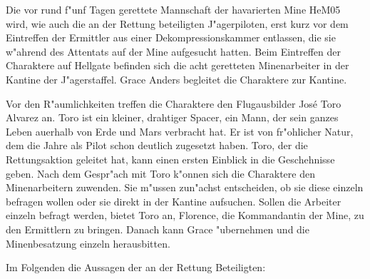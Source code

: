 
Die vor rund f"unf Tagen gerettete Mannschaft der havarierten Mine HeM05 wird, wie auch die an der Rettung beteiligten J"agerpiloten, erst kurz vor dem Eintreffen der Ermittler aus einer Dekompressionskammer entlassen, die sie w"ahrend des Attentats auf der Mine aufgesucht hatten. Beim Eintreffen der Charaktere auf Hellgate befinden sich die acht geretteten Minenarbeiter in der Kantine der J"agerstaffel. Grace Anders begleitet die Charaktere zur Kantine.

Vor den R"aumlichkeiten treffen die Charaktere den Flugausbilder Jos\'{e} \frqq{}Toro\flqq{} Alvarez an. Toro ist ein kleiner, drahtiger Spacer, ein Mann, der sein ganzes Leben au\3erhalb von Erde und Mars verbracht hat. Er ist von fr"ohlicher Natur, dem die Jahre als Pilot schon deutlich zugesetzt haben. Toro, der die Rettungsaktion geleitet hat, kann einen ersten Einblick in die Geschehnisse geben. Nach dem Gespr"ach mit Toro k"onnen sich die Charaktere den Minenarbeitern zuwenden. Sie m"ussen zun"achst entscheiden, ob sie diese einzeln befragen wollen oder sie direkt in der Kantine aufsuchen. Sollen die Arbeiter einzeln befragt werden, bietet Toro an, Florence, die Kommandantin der Mine, zu den Ermittlern zu bringen. Danach kann Grace "ubernehmen und die Minenbesatzung einzeln herausbitten.

Im Folgenden die Aussagen der an der Rettung Beteiligten:

